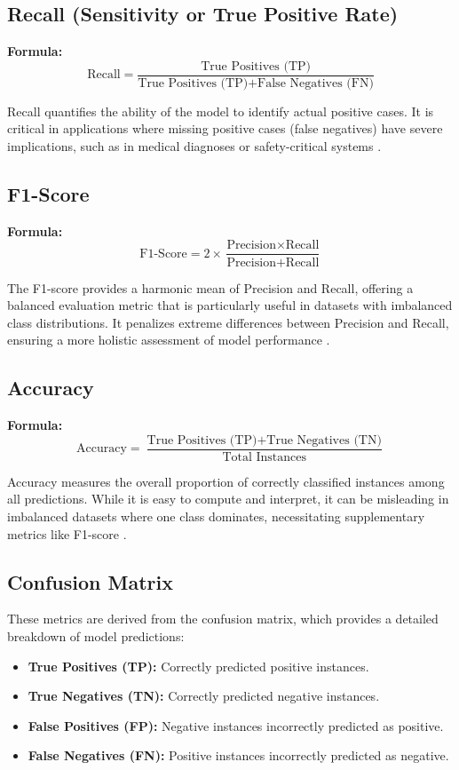 \subsection*{Recall (Sensitivity or True Positive Rate)}
\textbf{Formula:}
\[
\text{Recall} = \frac{\text{True Positives (TP)}}{\text{True Positives (TP)} + \text{False Negatives (FN)}}
\]

 
Recall quantifies the ability of the model to identify actual positive cases. It is critical in applications where missing positive cases (false negatives) have severe implications, such as in medical diagnoses or safety-critical systems \cite{hossin2015review}.

\subsection*{F1-Score}
\textbf{Formula:}
\[
\text{F1-Score} = 2 \times \frac{\text{Precision} \times \text{Recall}}{\text{Precision} + \text{Recall}}
\]


The F1-score provides a harmonic mean of Precision and Recall, offering a balanced evaluation metric that is particularly useful in datasets with imbalanced class distributions. It penalizes extreme differences between Precision and Recall, ensuring a more holistic assessment of model performance \cite{hossin2015review}.

\subsection*{Accuracy}
\textbf{Formula:}
\[
\text{Accuracy} = \frac{\text{True Positives (TP)} + \text{True Negatives (TN)}}{\text{Total Instances}}
\]


Accuracy measures the overall proportion of correctly classified instances among all predictions. While it is easy to compute and interpret, it can be misleading in imbalanced datasets where one class dominates, necessitating supplementary metrics like F1-score \cite{hossin2015review, dalianis2018clinical}.

\subsection*{Confusion Matrix}
These metrics are derived from the confusion matrix, which provides a detailed breakdown of model predictions:
\begin{itemize}
    \item \textbf{True Positives (TP):} Correctly predicted positive instances.
    \item \textbf{True Negatives (TN):} Correctly predicted negative instances.
    \item \textbf{False Positives (FP):} Negative instances incorrectly predicted as positive.
    \item \textbf{False Negatives (FN):} Positive instances incorrectly predicted as negative.
\end{itemize}

